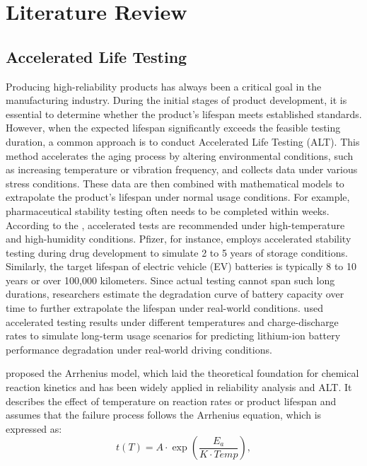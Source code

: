 \chapter{Literature Review \label{CH: review}}

\section{Accelerated Life Testing}

\hspace*{8mm} Producing high-reliability products has always been a critical goal in the manufacturing industry. During the initial stages of product development, it is essential to determine whether the product's lifespan meets established standards. However, when the expected lifespan significantly exceeds the feasible testing duration, a common approach is to conduct Accelerated Life Testing (ALT). This method accelerates the aging process by altering environmental conditions, such as increasing temperature or vibration frequency, and collects data under various stress conditions. These data are then combined with mathematical models to extrapolate the product's lifespan under normal usage conditions. For example, pharmaceutical stability testing often needs to be completed within weeks. According to the \cite{guideline2003stability}, accelerated tests are recommended under high-temperature and high-humidity conditions. Pfizer, for instance, employs accelerated stability testing during drug development to simulate 2 to 5 years of storage conditions. Similarly, the target lifespan of electric vehicle (EV) batteries is typically 8 to 10 years or over 100,000 kilometers. Since actual testing cannot span such long durations, researchers estimate the degradation curve of battery capacity over time to further extrapolate the lifespan under real-world conditions. \cite{uddin2017possibility} used accelerated testing results under different temperatures and charge-discharge rates to simulate long-term usage scenarios for predicting lithium-ion battery performance degradation under real-world driving conditions.

\hspace*{8mm} \cite{arrhenius1889reaktionsgeschwindigkeit} proposed the Arrhenius model, which laid the theoretical foundation for chemical reaction kinetics and has been widely applied in reliability analysis and ALT. It describes the effect of temperature on reaction rates or product lifespan and assumes that the failure process follows the Arrhenius equation, which is expressed as:
\begin{equation} \label{Arrhenius model}
t(T) = A \cdot \exp\left( \frac{E_a}{K \cdot Temp} \right),
\end{equation}

